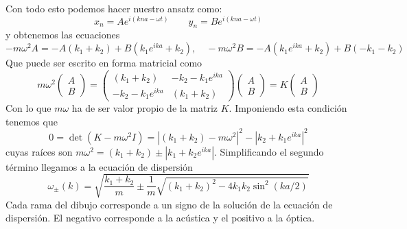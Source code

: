\documentclass[leqno]{article}
\begin{document}
Con todo esto podemos hacer nuestro ansatz como:
\[
x_n = A e^{i(kna-\omega t)} \qquad
y_n = B e^{i(kna-\omega t)}
\] 
y obtenemos las ecuaciones
\[
-m\omega ^2 A = -A(k_1+k_2)+ B(k_1e^{ika}+k_2), \quad 
-m\omega ^2 B = -A(k_1e^{ika}+k_2)+ B(-k_1-k_2)
\] 
Que puede ser escrito en forma matricial como
\[
  m\omega ^2 \begin{pmatrix} A\\B \end{pmatrix} = \begin{pmatrix} (k_1+k_2) & -k_2 -k_1e^{ika} \\ -k_2-k_1e^{ika} & (k_1+k_2) \end{pmatrix}  \begin{pmatrix} A\\B \end{pmatrix} = K\begin{pmatrix} A\\B \end{pmatrix} 
\] 
Con lo que $m\omega $ ha de ser valor propio de la matriz $K$. Imponiendo esta condición tenemos que
 \[
0 = \det(K-m\omega ^2I) = |(k_1+k_2)-m\omega ^2|^2 - |k_2 +k_1e^{ika}|^2
\] 
cuyas raíces son $m\omega^2 = (k_1+k_2) \pm |k_1+k_2e^{ika}|$. Simplificando el segundo término llegamos a la ecuación de dispersión 
\[
  \boxed{\omega _{\pm}(k) = \sqrt{ \frac{k_1+k_2}{m}\pm \frac{1}{m} \sqrt{(k_1+k_2)^2-4k_1k_2\sin^2(ka / 2)} } }
\] 
Cada rama del dibujo corresponde a un signo de la solución de la ecuación de dispersión. El negativo corresponde a la acústica y el positivo a la óptica.
\end{document}
